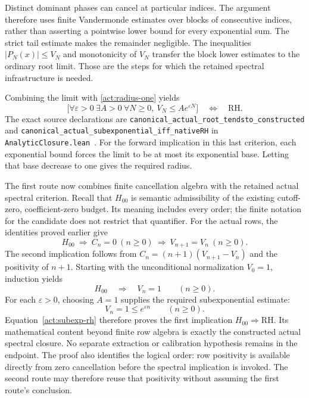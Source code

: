 Distinct dominant phases can cancel at particular indices. The argument
therefore uses finite Vandermonde estimates over blocks of consecutive
indices, rather than asserting a pointwise lower bound for every
exponential sum. The strict tail estimate makes the remainder negligible.
The inequalities $|P_N(x)|\le V_N$ and monotonicity of $V_N$ transfer the
block lower estimates to the ordinary root limit. Those are the steps
for which the retained spectral infrastructure is needed.

Combining the limit with \eqref{act:radius-one} yields
\begin{equation}\label{act:subexp-rh}
 \bigl[\forall\varepsilon>0\ \exists A>0\ \forall N\ge0,
       \ V_N\le Ae^{\varepsilon N}\bigr]
       \quad\Longleftrightarrow\quad\mathrm{RH}.
\end{equation}
The exact source declarations are
\texttt{canonical\_actual\_root\_tendsto\_constructed} and
\texttt{canonical\_actual\_subexponential\_iff\_nativeRH} in
\texttt{AnalyticClosure.lean}~\cite{source}.
For the forward implication in this last criterion, each exponential
bound forces the limit to be at most its exponential base. Letting
that base decrease to one gives the required radius.

\label{act:route-one}
The first route now combines finite cancellation algebra with the
retained actual spectral criterion. Recall that $H_{00}$ is semantic
admissibility of the existing cutoff-zero, coefficient-zero budget. Its
meaning includes every order; the finite notation for the candidate
does not restrict that quantifier. For the actual rows, the identities
proved earlier give
\begin{equation}\label{act:h00-chain}
 H_{00}\ \Longrightarrow\ C_n=0\ (n\ge0)
 \ \Longrightarrow\ V_{n+1}=V_n\ (n\ge0).
\end{equation}
The second implication follows from
$C_n=(n+1)(V_{n+1}-V_n)$ and the positivity of $n+1$.
Starting with the unconditional normalization $V_0=1$, induction yields
\begin{equation}
 H_{00}\quad\Longrightarrow\quad V_n=1\qquad(n\ge0).
\end{equation}
For each $\varepsilon>0$, choosing $A=1$ supplies the required
subexponential estimate:
\begin{equation}
 V_n=1\le e^{\varepsilon n}\qquad(n\ge0).
\end{equation}
Equation~\eqref{act:subexp-rh} therefore proves the first implication
$H_{00}\Rightarrow\mathrm{RH}$. Its mathematical content beyond finite
row algebra is exactly the constructed actual spectral closure. No
separate extraction or calibration hypothesis remains in the endpoint.
The proof also identifies the logical order: row positivity is available
directly from zero cancellation before the spectral implication is
invoked. The second route may therefore reuse that positivity without
assuming the first route's conclusion.

